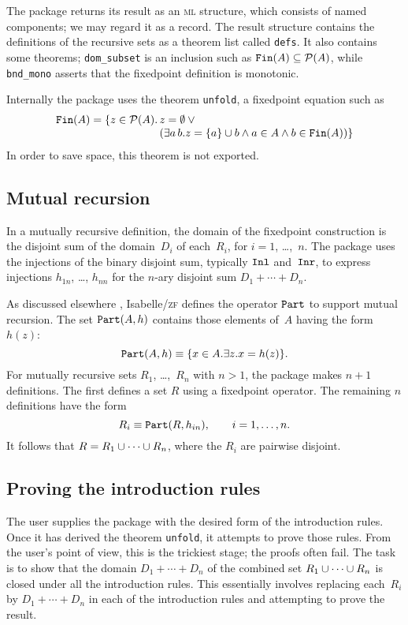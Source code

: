\documentclass[12pt]{article}
\newcommand\sbs{\subseteq}
\newcommand\pow{{\cal P}}
\newcommand\Inl{\hbox{\tt Inl}}
\newcommand\Inr{\hbox{\tt Inr}}
\newcommand\Part{\hbox{\tt Part}}
\newcommand\Fin{\hbox{\tt Fin}}
\begin{document}
The package returns its result as an \textsc{ml} structure, which consists of named
components; we may regard it as a record.  The result structure contains
the definitions of the recursive sets as a theorem list called {\tt defs}.
It also contains some theorems; {\tt dom\_subset} is an inclusion such as 
$\Fin(A)\sbs\pow(A)$, while {\tt bnd\_mono} asserts that the fixedpoint
definition is monotonic.

Internally the package uses the theorem {\tt unfold}, a fixedpoint equation
such as
\[
  \begin{array}[t]{r@{\,}l}
     \Fin(A) = \{z\in\pow(A). & z=\emptyset \disj{} \\
             &(\exists a\,b. z=\{a\}\un b\conj a\in A\conj b\in \Fin(A))\}
  \end{array}
\]
In order to save space, this theorem is not exported.  


\subsection{Mutual recursion} \label{mutual-sec}
In a mutually recursive definition, the domain of the fixedpoint construction
is the disjoint sum of the domain~$D_i$ of each~$R_i$, for $i=1$,
\ldots,~$n$.  The package uses the injections of the
binary disjoint sum, typically $\Inl$ and~$\Inr$, to express injections
$h_{1n}$, \ldots, $h_{nn}$ for the $n$-ary disjoint sum $D_1+\cdots+D_n$.

As discussed elsewhere \cite[\S4.5]{paulson-set-II}, Isabelle/\textsc{zf} defines the
operator $\Part$ to support mutual recursion.  The set $\Part(A,h)$
contains those elements of~$A$ having the form~$h(z)$:
\[ \Part(A,h)  \equiv \{x\in A. \exists z. x=h(z)\}. \]   
For mutually recursive sets $R_1$, \ldots,~$R_n$ with
$n>1$, the package makes $n+1$ definitions.  The first defines a set $R$ using
a fixedpoint operator. The remaining $n$ definitions have the form
\[ R_i \equiv \Part(R,h_{in}), \qquad i=1,\ldots, n.  \] 
It follows that $R=R_1\cup\cdots\cup R_n$, where the $R_i$ are pairwise disjoint.


\subsection{Proving the introduction rules}
The user supplies the package with the desired form of the introduction
rules.  Once it has derived the theorem {\tt unfold}, it attempts
to prove those rules.  From the user's point of view, this is the
trickiest stage; the proofs often fail.  The task is to show that the domain 
$D_1+\cdots+D_n$ of the combined set $R_1\cup\cdots\cup R_n$ is
closed under all the introduction rules.  This essentially involves replacing
each~$R_i$ by $D_1+\cdots+D_n$ in each of the introduction rules and
attempting to prove the result.
\end{document}
